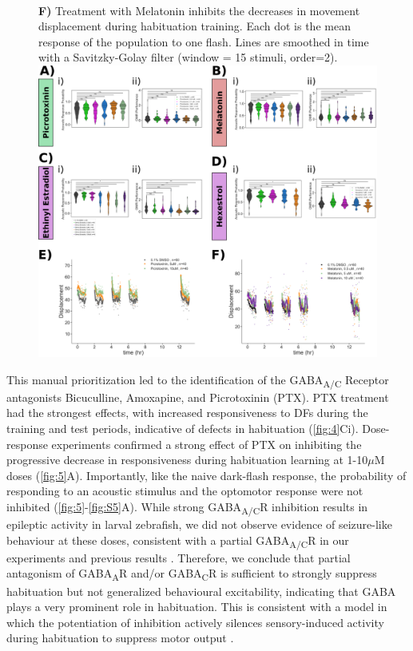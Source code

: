 \documentclass[9pt,lineno]{RandlettLab_elife}
\begin{document}
\begin{figure}
{\\ \textbf{F)} Treatment with Melatonin inhibits the decreases in movement displacement during habituation training. Each dot is the mean response of the population to one flash. Lines are smoothed in time with a Savitzky-Golay filter (window = 15 stimuli, order=2).}{\includegraphics[width=14cm]{FigureS2_DrugBehavData_wDisp.png}}
\label{fig:S5}
\end{figure}


This manual prioritization led to the identification of the GABA\textsubscript{A/C} Receptor antagonists Bicuculline, Amoxapine, and Picrotoxinin (PTX). PTX treatment had the strongest effects, with increased responsiveness to DFs during the training and test periods, indicative of defects in habituation (\autoref{fig:4}Ci). Dose-response experiments confirmed a strong effect of PTX on inhibiting the progressive decrease in responsiveness during habituation learning at 1-10$\mu$M doses (\autoref{fig:5}A). Importantly, like the naive dark-flash response, the probability of responding to an acoustic stimulus and the optomotor response were not inhibited (\autoref{fig:5}-\autoref{fig:S5}A). While strong GABA\textsubscript{A/C}R inhibition results in epileptic activity in larval zebrafish, we did not observe evidence of seizure-like behaviour at these doses, consistent with a partial GABA\textsubscript{A/C}R in our experiments and previous results \citep{Bandara2020-nm}. Therefore, we conclude that partial antagonism of GABA\textsubscript{A}R and/or GABA\textsubscript{C}R is sufficient to strongly suppress habituation but not generalized behavioural excitability, indicating that GABA plays a very prominent role in habituation. This is consistent with a model in which the potentiation of inhibition actively silences sensory-induced activity during habituation to suppress motor output \citep{Cooke2020-mz, Ramaswami2014-du}. 
\end{document}
